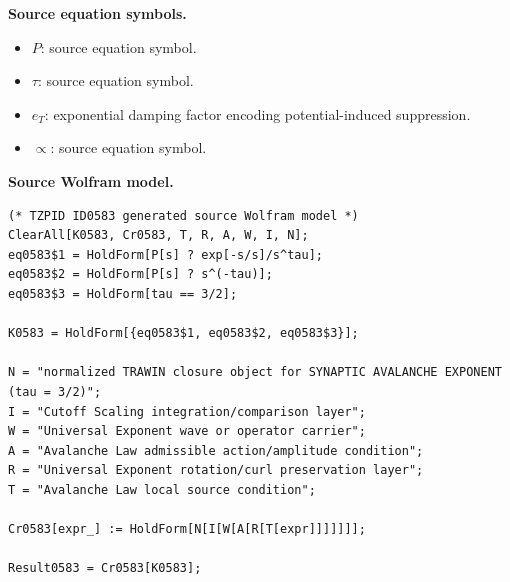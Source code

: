 \begin{minipage}[t]{0.49\linewidth}
\begingroup
\small
\raggedright
\textbf{Source equation symbols.}\par
\begin{itemize}[leftmargin=1.35em,itemsep=1pt,topsep=1pt,parsep=0pt]
    \item $P$: source equation symbol.
    \item $\tau$: source equation symbol.
    \item $e_T$: exponential damping factor encoding potential-induced suppression.
    \item $\propto$: source equation symbol.
\end{itemize}
\endgroup
\end{minipage}\hfill
\begin{minipage}[t]{0.47\linewidth}
\begingroup
\scriptsize
\raggedright
\textbf{Source Wolfram model.}\par
\begin{Verbatim}[fontsize=\tiny,breaklines=true,breakanywhere=true]
(* TZPID ID0583 generated source Wolfram model *)
ClearAll[K0583, Cr0583, T, R, A, W, I, N];
eq0583$1 = HoldForm[P[s] ? exp[-s/s]/s^tau];
eq0583$2 = HoldForm[P[s] ? s^(-tau)];
eq0583$3 = HoldForm[tau == 3/2];

K0583 = HoldForm[{eq0583$1, eq0583$2, eq0583$3}];

N = "normalized TRAWIN closure object for SYNAPTIC AVALANCHE EXPONENT (tau = 3/2)";
I = "Cutoff Scaling integration/comparison layer";
W = "Universal Exponent wave or operator carrier";
A = "Avalanche Law admissible action/amplitude condition";
R = "Universal Exponent rotation/curl preservation layer";
T = "Avalanche Law local source condition";

Cr0583[expr_] := HoldForm[N[I[W[A[R[T[expr]]]]]]];

Result0583 = Cr0583[K0583];
\end{Verbatim}
\endgroup
\end{minipage}


